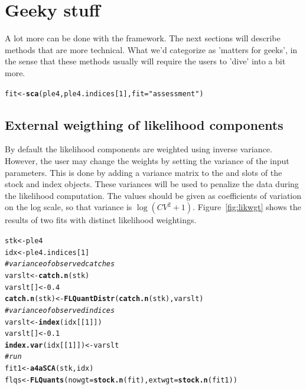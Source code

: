 \documentclass[a4paper,english,10pt]{article}\usepackage[]{graphicx}\usepackage[]{color}
\makeatletter
\newcommand{\hlnum}[1]{\textcolor[rgb]{0.686,0.059,0.569}{#1}}%
\newcommand{\hlstr}[1]{\textcolor[rgb]{0.192,0.494,0.8}{#1}}%
\newcommand{\hlcom}[1]{\textcolor[rgb]{0.678,0.584,0.686}{\textit{#1}}}%
\newcommand{\hlstd}[1]{\textcolor[rgb]{0.345,0.345,0.345}{#1}}%
\newcommand{\hlkwb}[1]{\textcolor[rgb]{0.69,0.353,0.396}{#1}}%
\newcommand{\hlkwc}[1]{\textcolor[rgb]{0.333,0.667,0.333}{#1}}%
\newcommand{\hlkwd}[1]{\textcolor[rgb]{0.737,0.353,0.396}{\textbf{#1}}}%
\newenvironment{kframe}{%
 \def\at@end@of@kframe{}%
 \ifinner\ifhmode%
  \def\at@end@of@kframe{\end{minipage}}%
  \begin{minipage}{\columnwidth}%
 \fi\fi%
 \def\FrameCommand##1{\hskip\@totalleftmargin \hskip-\fboxsep
 \colorbox{shadecolor}{##1}\hskip-\fboxsep
     \hskip-\linewidth \hskip-\@totalleftmargin \hskip\columnwidth}%
 \MakeFramed {\advance\hsize-\width
   \@totalleftmargin\z@ \linewidth\hsize
   \@setminipage}}%
 {\par\unskip\endMakeFramed%
 \at@end@of@kframe}
\newenvironment{knitrout}{}{} %
\makeatother
\begin{document}
\section{Geeky stuff}

A lot more can be done with the \aFa framework. The next sections will describe methods that are more technical. What we'd categorize as 'matters for geeks', in the sense that these methods usually will require the users to 'dive' into  a bit more. 

\begin{knitrout}
\color{fgcolor}\begin{kframe}
\begin{alltt}
\hlstd{fit} \hlkwb{<-} \hlkwd{sca}\hlstd{(ple4, ple4.indices[}\hlnum{1}\hlstd{],} \hlkwc{fit} \hlstd{=} \hlstr{"assessment"}\hlstd{)}
\end{alltt}
\end{kframe}
\end{knitrout}

\subsection{External weigthing of likelihood components}

By default the likelihood components are weighted using inverse variance. However, the user may change the weights by setting the variance of the input parameters. This is done by adding a variance matrix to the  and  slots of the stock and index objects. These variances will be used to penalize the data during the likelihood computation. The values should be given as coefficients of variation on the log scale, so that variance is $\log{({CV}^2 + 1)}$. Figure~\ref{fig:likwgt} shows the results of two fits with distinct likelihood weightings.

\begin{knitrout}
\color{fgcolor}\begin{kframe}
\begin{alltt}
\hlstd{stk} \hlkwb{<-} \hlstd{ple4}
\hlstd{idx} \hlkwb{<-} \hlstd{ple4.indices[}\hlnum{1}\hlstd{]}
\hlcom{# variance of observed catches}
\hlstd{varslt} \hlkwb{<-} \hlkwd{catch.n}\hlstd{(stk)}
\hlstd{varslt[]} \hlkwb{<-} \hlnum{0.4}
\hlkwd{catch.n}\hlstd{(stk)} \hlkwb{<-} \hlkwd{FLQuantDistr}\hlstd{(}\hlkwd{catch.n}\hlstd{(stk), varslt)}
\hlcom{# variance of observed indices}
\hlstd{varslt} \hlkwb{<-} \hlkwd{index}\hlstd{(idx[[}\hlnum{1}\hlstd{]])}
\hlstd{varslt[]} \hlkwb{<-} \hlnum{0.1}
\hlkwd{index.var}\hlstd{(idx[[}\hlnum{1}\hlstd{]])} \hlkwb{<-} \hlstd{varslt}
\hlcom{# run}
\hlstd{fit1} \hlkwb{<-} \hlkwd{a4aSCA}\hlstd{(stk, idx)}
\hlstd{flqs} \hlkwb{<-} \hlkwd{FLQuants}\hlstd{(}\hlkwc{nowgt} \hlstd{=} \hlkwd{stock.n}\hlstd{(fit),} \hlkwc{extwgt} \hlstd{=} \hlkwd{stock.n}\hlstd{(fit1))}
\end{alltt}
\end{kframe}
\end{knitrout}
\end{document}
